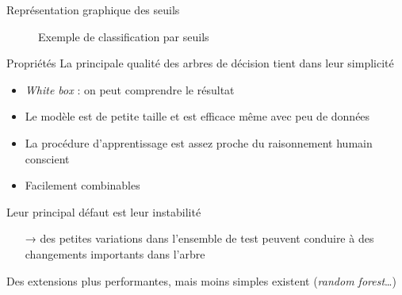 \documentclass[hyperref={unicode}, xcolor={svgnames}, french]{beamer}
\begin{document}
\begin{frame}[fragile]{Représentation graphique des seuils}
    \begin{figure}
        \caption{Exemple de classification par seuils}
    \end{figure}
\end{frame}

\begin{frame}{Propriétés}
    La principale qualité des arbres de décision tient dans leur simplicité
    \begin{itemize}
        \item \emph{White box} : on peut comprendre le résultat
        \item Le modèle est de petite taille et est efficace même avec peu de données
        \item La procédure d'apprentissage est assez proche du raisonnement humain conscient
        \item Facilement combinables
    \end{itemize}
    Leur principal défaut est leur instabilité
    \begin{itemize}
        \item[→] des petites variations dans l'ensemble de test peuvent conduire à des changements importants dans l'arbre
    \end{itemize}
    Des extensions plus performantes, mais moins simples existent (\emph{random forest}…)
\end{frame}
\end{document}

